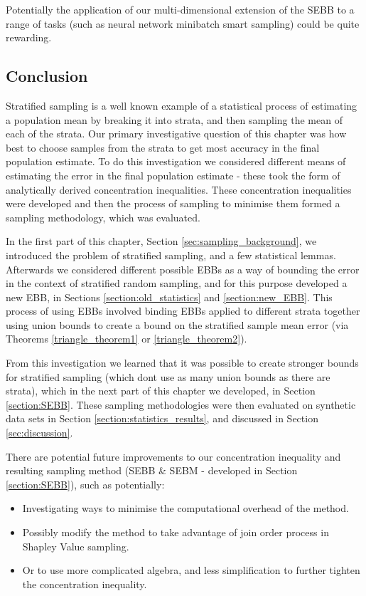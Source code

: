 Potentially the application of our multi-dimensional extension of the SEBB to a range of tasks (such as neural network minibatch smart sampling) could be quite rewarding.


\subsection{Conclusion}

Stratified sampling is a well known example of a statistical process of estimating a population mean by breaking it into strata, and then sampling the mean of each of the strata.
Our primary investigative question of this chapter was how best to choose samples from the strata to get most accuracy in the final population estimate.
To do this investigation we considered different means of estimating the error in the final population estimate - these took the form of analytically derived concentration inequalities.
These concentration inequalities were developed and then the process of sampling to minimise them formed a sampling methodology, which was evaluated.

In the first part of this chapter, Section \ref{sec:sampling_background}, we introduced the problem of stratified sampling, and a few statistical lemmas.
Afterwards we considered different possible EBBs as a way of bounding the error in the context of stratified random sampling, and for this purpose developed a new EBB, in Sections \ref{section:old_statistics} and \ref{section:new_EBB}.
This process of using EBBs involved binding EBBs applied to different strata together using union bounds to create a bound on the stratified sample mean error (via Theorems \ref{triangle_theorem1} or \ref{triangle_theorem2}).

From this investigation we learned that it was possible to create stronger bounds for stratified sampling (which dont use as many union bounds as there are strata), which in the next part of this chapter we developed, in Section \ref{section:SEBB}.
These sampling methodologies were then evaluated on synthetic data sets in Section \ref{section:statistics_results}, and discussed in Section \ref{sec:discussion}.

There are potential future improvements to our concentration inequality and resulting sampling method (SEBB \& SEBM - developed in Section \ref{section:SEBB}), such as potentially:
\begin{itemize}
\item	Investigating ways to minimise the computational overhead of the method.
\item	Possibly modify the method to take advantage of join order process in Shapley Value sampling.
\item	Or to use more complicated algebra, and less simplification to further tighten the concentration inequality.
\end{itemize}

